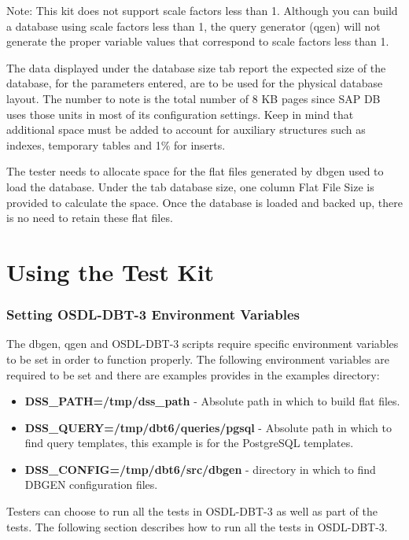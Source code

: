 \documentclass{article}
\begin{document}
Note:  This kit does not support scale factors less than 1.  Although you can
build a database using scale factors less than 1, the query generator (qgen)
will not generate the proper variable values that correspond to scale factors
less than 1.

The data displayed under the database size tab report the expected size of the
database, for the parameters entered, are to be used for the physical database
layout.  The number to note is the total number of 8 KB pages since SAP DB uses
those units in most of its configuration settings.  Keep in mind that
additional space must be added to account for auxiliary structures such as
indexes, temporary tables and 1\% for inserts.

The tester needs to allocate space for the flat files generated by dbgen used
to load the database.  Under the tab database size, one column Flat File Size
is provided to calculate the space.  Once the database is loaded and backed up,
there is no need to retain these flat files.

\section{Using the Test Kit}

\subsubsection{Setting OSDL-DBT-3 Environment Variables}

The dbgen, qgen and OSDL-DBT-3 scripts require specific environment variables
to be set in order to function properly.  The following environment variables
are required to be set and there are examples provides in the examples
directory:

\begin{itemize}
  \item \textbf{DSS\_PATH=/tmp/dss\_path} - Absolute path in which to build
        flat files.
  \item \textbf{DSS\_QUERY=/tmp/dbt6/queries/pgsql} - Absolute path in which to
        find query templates, this example is for the PostgreSQL templates.
  \item \textbf{DSS\_CONFIG=/tmp/dbt6/src/dbgen} - directory in which to find
        DBGEN configuration files.
\end{itemize}

Testers can choose to run all the tests in OSDL-DBT-3 as well as part of the
tests.  The following section describes how to run all the tests in OSDL-DBT-3.
\end{document}
